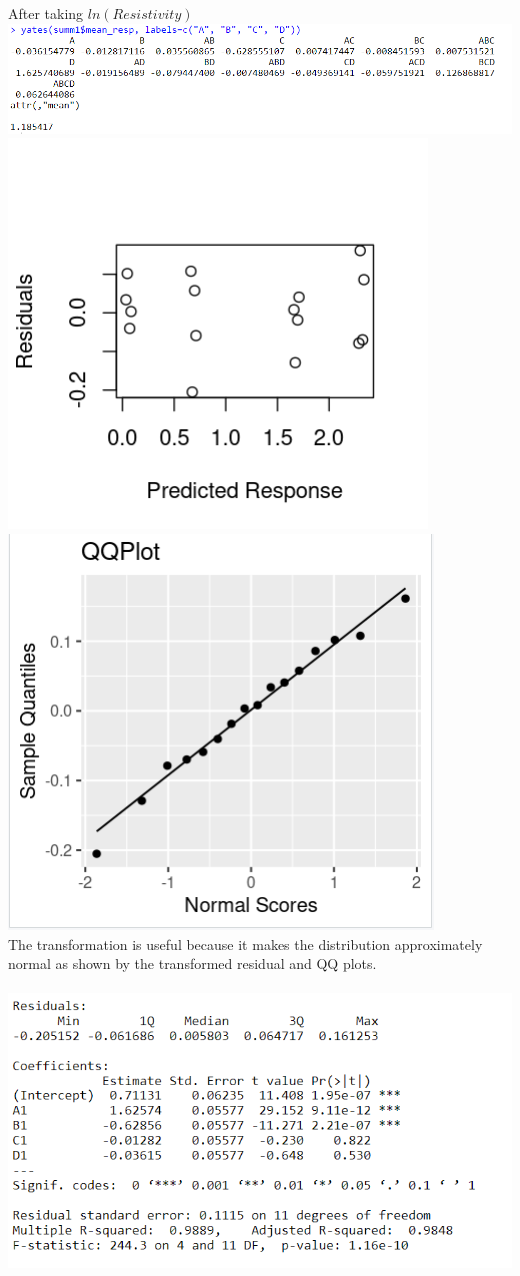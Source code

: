 \documentclass{article}
\begin{document}
\\
\\After taking $ln(Resistivity)$
\\\includegraphics{6.33c1.PNG}
\\\includegraphics{6.33cRes.PNG} \includegraphics{6.33cQQ.PNG}
\\The transformation is useful because it makes the distribution approximately normal as shown by the transformed residual and QQ plots.
\\
\\\includegraphics{6.33d.PNG}
\end{document}
